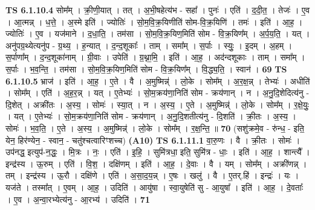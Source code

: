 \documentclass[17pt]{extarticle}
\begin{document}
                                \textbf{ TS 6.1.10.4} \newline
                  सोम᳚म् । क्री॒णी॒यात् । तत् । अ॒भी॒षहेत्य॑भ - सहा᳚ । पुनः॑ । एति॑ । द॒दी॒त॒ । तेजः॑ । ए॒व । आ॒त्मन्न् । ध॒त्ते॒ । अ॒स्मे इति॑ । ज्योतिः॑ । सो॒म॒वि॒क्र॒यिणीति॑ सोम-वि॒क्र॒यिणि॑ । तमः॑ । इति॑ । आ॒ह॒ । ज्योतिः॑ । ए॒व । यज॑माने । द॒धा॒ति॒ । तम॑सा । सो॒म॒वि॒क्र॒यिण॒मिति॑ सोम - वि॒क्र॒यिण᳚म् । अ॒र्प॒य॒ति॒ । यत् । अनु॑पग्र॒थ्येत्यनु॑प - ग्र॒थ्य॒ । ह॒न्यात् । द॒न्द॒शूकाः᳚ । ताम् । समा᳚म् । स॒र्पाः । स्युः॒ । इ॒दम् । अ॒हम् । स॒र्पाणा᳚म् । द॒न्द॒शूका॑नाम् । ग्री॒वाः । उपेति॑ । ग्र॒थ्ना॒मि॒ । इति॑ । आ॒ह॒ । अद॑न्दशूकाः । ताम् । समा᳚म् । स॒र्पाः । भ॒व॒न्ति॒ । तम॑सा । सो॒म॒वि॒क्र॒यिण॒मिति॑ सोम - वि॒क्र॒यिण᳚म् । वि॒द्ध्य॒ति॒ । स्वान॑ । \textbf{  69} \newline
                  \newline
                                \textbf{ TS 6.1.10.5} \newline
                  भ्राज॑ । इति॑ । आ॒ह॒ । ए॒ते । वै । अ॒मुष्मिन्न्॑ । लो॒के । सोम᳚म् । अ॒र॒क्ष॒न्न् । तेभ्यः॑ । अधीति॑ । सोम᳚म् । एति॑ । अ॒ह॒र॒न्न् । यत् । ए॒तेभ्यः॑ । सो॒म॒क्रय॑णा॒निति॑ सोम - क्रय॑णान् । न । अ॒नु॒दि॒शेदित्य॑नु - दि॒शेत् । अक्री॑तः । अ॒स्य॒ । सोमः॑ । स्या॒त् । न । अ॒स्य॒ । ए॒ते । अ॒मुष्मिन्न्॑ । लो॒के । सोम᳚म् । र॒क्षे॒युः॒ । यत् । ए॒तेभ्यः॑ । सो॒म॒क्रय॑णा॒निति॑ सोम - क्रय॑णान् । अ॒नु॒दि॒शतीत्य॑नु - दि॒शति॑ । क्री॒तः । अ॒स्य॒ । सोमः॑ । भ॒व॒ति॒ । ए॒ते । अ॒स्य॒ । अ॒मुष्मिन्न्॑ । लो॒के । सोम᳚म् । र॒क्ष॒न्ति॒ ॥ \textbf{  70} \newline
                  \newline
                      (सशु॑क्रमे॒व - रु॑न्ध॒ - इति॒ येन॒ हिर॑ण्येन॒ - स्वान॒ - चतु॑श्चत्वारिꣳशच्च)  \textbf{(A10)} \newline \newline
                                \textbf{ TS 6.1.11.1} \newline
                  वा॒रु॒णः । वै । क्री॒तः । सोमः॑ । उप॑नद्ध॒ इत्युप॑-न॒द्धः॒ । मि॒त्रः । नः॒ । एति॑ । इ॒हि॒ । सुमि॑त्रधा॒ इति॒ सुमि॑त्र - धाः॒ । इति॑ । आ॒ह॒ । शान्त्यै᳚ । इन्द्र॑स्य । ऊ॒रुम् । एति॑ । वि॒श॒ । दक्षि॑णम् । इति॑ । आ॒ह॒ । दे॒वाः । वै । यम् । सोम᳚म् । अक्री॑णन्न् । तम् । इन्द्र॑स्य । ऊ॒रौ । दक्षि॑णे । एति॑ । अ॒सा॒द॒य॒न्न् । ए॒षः । खलु॑ । वै । ए॒तर्.हि॑ । इन्द्रः॑ । यः । यज॑ते । तस्मा᳚त् । ए॒वम् । आ॒ह॒ । उदिति॑ । आयु॑षा । स्वा॒युषेति॑ सु - आ॒युषा᳚ । इति॑ । आ॒ह॒ । दे॒वताः᳚ । ए॒व । अ॒न्वा॒रभ्येत्य॑नु - आ॒रभ्य॑ । उदिति॑ । \textbf{  71} \newline
                  \newline
\end{document}
